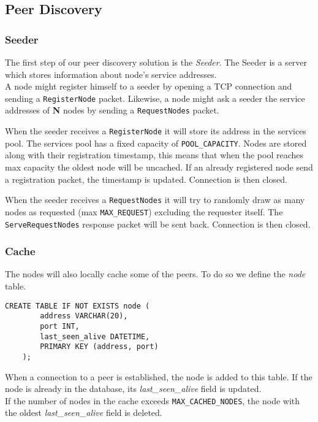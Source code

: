 \documentclass[../documentation.tex]{subfiles}
\begin{document}
\subsection{Peer Discovery}

\subsubsection{Seeder}

The first step of our peer discovery solution is the \textit{Seeder}.
The Seeder is a server which stores information about node's service addresses.
\\
A node might register himself to a seeder by opening a TCP connection and sending
a \texttt{RegisterNode} packet.
Likewise, a node might ask a seeder the service addresses of \textbf{N} nodes by sending a
\texttt{RequestNodes} packet.

When the seeder receives a \texttt{RegisterNode} it will store its address in the
services pool. The services pool has a fixed capacity of \texttt{POOL\_CAPACITY}.
Nodes are stored along with their registration timestamp, this means that when the pool
reaches max capacity the oldest node will be uncached. If an already registered node
send a registration packet, the timestamp is updated.
Connection is then closed.

When the seeder receives a \texttt{RequestNodes} it will try to randomly draw
as many nodes as requested (max \texttt{MAX\_REQUEST}) excluding the requester itself.
The \texttt{ServeRequestNodes} response packet will be sent back.
Connection is then closed.

\subsubsection{Cache}

The nodes will also locally cache some of the peers.
To do so we define the \textit{node} table.

\begin{lstlisting}[style=sql]
    CREATE TABLE IF NOT EXISTS node (
        address VARCHAR(20),
        port INT,
        last_seen_alive DATETIME,
        PRIMARY KEY (address, port)
    );
\end{lstlisting}

When a connection to a peer is established, the node is added to this table.
If the node is already in the database, its \textit{last\_seen\_alive} field is updated.
\\
If the number of nodes in the cache exceeds \texttt{MAX\_CACHED\_NODES},
the node with the oldest \textit{last\_seen\_alive} field is deleted.
\end{document}
